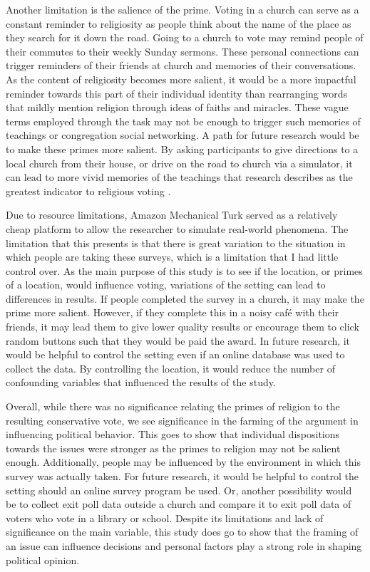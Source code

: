 \documentclass[letterpaper,man,natbib,noextraspace,12pt]{apa6}  %
\begin{document}
Another limitation is the salience of the prime. Voting in a church can serve as a constant reminder to religiosity as people think about the name of the place as they search for it down the road. Going to a church to vote may remind people of their commutes to their weekly Sunday sermons. These personal connections can trigger reminders of their friends at church and memories of their conversations. As the content of religiosity becomes more salient, it would be a more impactful reminder towards this part of their individual identity than rearranging words that mildly mention religion through ideas of faiths and miracles. These vague terms employed through the task may not be enough to trigger such memories of teachings or congregation social networking. A path for future research would be to make these primes more salient. By asking participants to give directions to a local church from their house, or drive on the road to church via a simulator, it can lead to more vivid memories of the teachings that research describes as the greatest indicator to religious voting \citep{putnam_american_2010}.

Due to resource limitations, Amazon Mechanical Turk served as a relatively cheap platform to allow the researcher to simulate real-world phenomena. The limitation that this presents is that there is great variation to the situation in which people are taking these surveys, which is a limitation that I had little control over. As the main purpose of this study is to see if the location, or primes of a location, would influence voting, variations of the setting can lead to differences in results. If people completed the survey in a church, it may make the prime more salient. However, if they complete this in a noisy café with their friends, it may lead them to give lower quality results or encourage them to click random buttons such that they would be paid the award. In future research, it would be helpful to control the setting even if an online database was used to collect the data. By controlling the location, it would reduce the number of confounding variables that influenced the results of the study. 

Overall, while there was no significance relating the primes of religion to the resulting conservative vote, we see significance in the farming of the argument in influencing political behavior. This goes to show that individual dispositions towards the issues were stronger as the primes to religion may not be salient enough. Additionally, people may be influenced by the environment in which this survey was actually taken. For future research, it would be helpful to control the setting should an online survey program be used. Or, another possibility would be to collect exit poll data outside a church and compare it to exit poll data of voters who vote in a library or school. Despite its limitations and lack of significance on the main variable, this study does go to show that the framing of an issue can influence decisions and personal factors play a strong role in shaping political opinion. 
\end{document}
